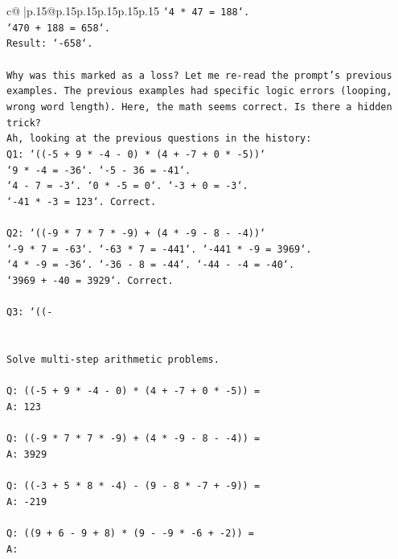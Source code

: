 \documentclass{article}
\begin{document}
{\begin{supertabular}{c@{$\;$}|p{.15\linewidth}@{}p{.15\linewidth}p{.15\linewidth}p{.15\linewidth}p{.15\linewidth}p{.15\linewidth}}
{{{\texttt{`4 * 47 = 188`.} \\
\texttt{`470 + 188 = 658`.} \\
\texttt{Result: `{-}658`.} \\
\\ 
\texttt{Why was this marked as a loss? Let me re{-}read the prompt's previous examples. The previous examples had specific logic errors (looping, wrong word length). Here, the math seems correct. Is there a hidden trick?} \\
\texttt{Ah, looking at the previous questions in the history:} \\
\texttt{Q1: `(({-}5 + 9 * {-}4 {-} 0) * (4 + {-}7 + 0 * {-}5))`} \\
\texttt{`9 * {-}4 = {-}36`. `{-}5 {-} 36 = {-}41`.} \\
\texttt{`4 {-} 7 = {-}3`. `0 * {-}5 = 0`. `{-}3 + 0 = {-}3`.} \\
\texttt{`{-}41 * {-}3 = 123`. Correct.} \\
\\ 
\texttt{Q2: `(({-}9 * 7 * 7 * {-}9) + (4 * {-}9 {-} 8 {-} {-}4))`} \\
\texttt{`{-}9 * 7 = {-}63`. `{-}63 * 7 = {-}441`. `{-}441 * {-}9 = 3969`.} \\
\texttt{`4 * {-}9 = {-}36`. `{-}36 {-} 8 = {-}44`. `{-}44 {-} {-}4 = {-}40`.} \\
\texttt{`3969 + {-}40 = 3929`. Correct.} \\
\\ 
\texttt{Q3: `(({-}} \\
\\ 
\\ 
\texttt{Solve multi{-}step arithmetic problems.} \\
\\ 
\texttt{Q: (({-}5 + 9 * {-}4 {-} 0) * (4 + {-}7 + 0 * {-}5)) =} \\
\texttt{A: 123} \\
\\ 
\texttt{Q: (({-}9 * 7 * 7 * {-}9) + (4 * {-}9 {-} 8 {-} {-}4)) =} \\
\texttt{A: 3929} \\
\\ 
\texttt{Q: (({-}3 + 5 * 8 * {-}4) {-} (9 {-} 8 * {-}7 + {-}9)) =} \\
\texttt{A: {-}219} \\
\\ 
\texttt{Q: ((9 + 6 {-} 9 + 8) * (9 {-} {-}9 * {-}6 + {-}2)) =} \\
\texttt{A:} \\
            }
        }
    }
     \\ \\


\end{supertabular}}
\end{document}
